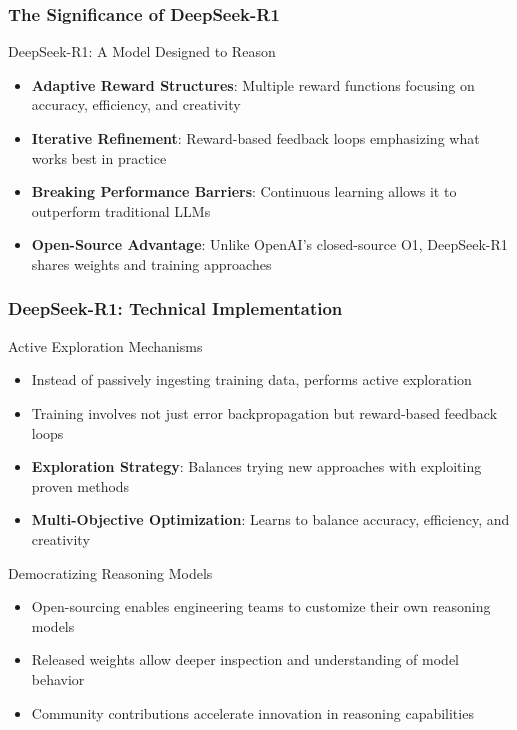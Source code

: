 \documentclass[aspectratio=169]{beamer}
\begin{document}
\begin{frame}
	\frametitle{The Significance of DeepSeek-R1}
	\begin{block}{DeepSeek-R1: A Model Designed to Reason}
		\begin{itemize}
			\item \textbf{Adaptive Reward Structures}: Multiple reward functions focusing on accuracy, efficiency, and creativity
			\item \textbf{Iterative Refinement}: Reward-based feedback loops emphasizing what works best in practice
			\item \textbf{Breaking Performance Barriers}: Continuous learning allows it to outperform traditional LLMs
			\item \textbf{Open-Source Advantage}: Unlike OpenAI's closed-source O1, DeepSeek-R1 shares weights and training approaches
		\end{itemize}
	\end{block}
\end{frame}

\begin{frame}
	\frametitle{DeepSeek-R1: Technical Implementation}
	\begin{block}{Active Exploration Mechanisms}
		\begin{itemize}
			\item Instead of passively ingesting training data, performs active exploration
			\item Training involves not just error backpropagation but reward-based feedback loops
			\item \textbf{Exploration Strategy}: Balances trying new approaches with exploiting proven methods
			\item \textbf{Multi-Objective Optimization}: Learns to balance accuracy, efficiency, and creativity
		\end{itemize}
	\end{block}
	\begin{block}{Democratizing Reasoning Models}
		\begin{itemize}
			\item Open-sourcing enables engineering teams to customize their own reasoning models
			\item Released weights allow deeper inspection and understanding of model behavior
			\item Community contributions accelerate innovation in reasoning capabilities
		\end{itemize}
	\end{block}
\end{frame}
\end{document}
